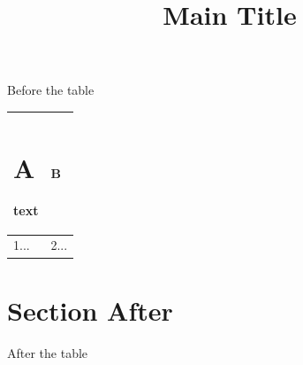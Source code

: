 \documentclass[11pt,a4paper]{article}
\title{Main Title}
\begin{document}
\maketitle

Before the table

\begin{table}[h]
\begin{tabular}{|l|l|}
\hline
\section{A}  text & B \\ \hline
1... & 2... \\ \hline
\end{tabular}
\end{table}

\section{Section After}

After the table
\end{document}
